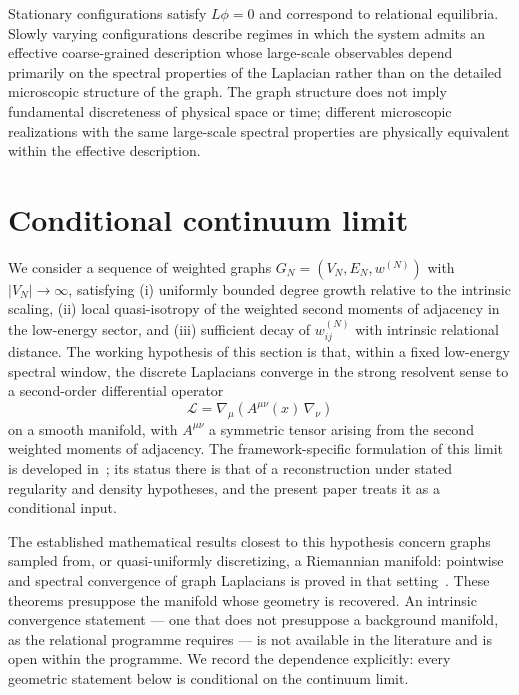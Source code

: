 \documentclass[epj]{svjour}
\begin{document}
  Stationary configurations satisfy $L\phi = 0$ and correspond to relational equilibria.
  Slowly varying configurations describe regimes in which the system admits an effective
  coarse-grained description whose large-scale observables depend primarily on the spectral
  properties of the Laplacian rather than on the detailed microscopic structure of the graph.
  The graph structure does not imply fundamental discreteness of physical space or time; different
  microscopic realizations with the same large-scale spectral properties are physically equivalent
  within the effective description.

  \section{Conditional continuum limit}
  \label{sec:continuum-limit-and-effective-operators}

  We consider a sequence of weighted graphs $G_N = (V_N, E_N, w^{(N)})$ with $|V_N| \to \infty$,
  satisfying
  (i) uniformly bounded degree growth relative to the intrinsic scaling,
  (ii) local quasi-isotropy of the weighted second moments of adjacency in the low-energy sector,
  and (iii) sufficient decay of $w^{(N)}_{ij}$ with intrinsic relational distance.
  The working hypothesis of this section is that, within a fixed low-energy spectral window, the
  discrete Laplacians converge in the strong resolvent sense to a second-order differential
  operator
  \begin{equation}
    \mathcal{L}
    = \nabla_\mu\!\left(A^{\mu\nu}(x)\,\nabla_\nu\right)
    \label{eq:limit-operator}
  \end{equation}
  on a smooth manifold, with $A^{\mu\nu}$ a symmetric tensor arising from the second weighted
  moments of adjacency.
  The framework-specific formulation of this limit is developed in~\cite{Beau2026a}; its status
  there is that of a reconstruction under stated regularity and density hypotheses, and the present
  paper treats it as a conditional input.

  The established mathematical results closest to this hypothesis concern graphs sampled from, or
  quasi-uniformly discretizing, a Riemannian manifold: pointwise and spectral convergence of graph
  Laplacians is proved in that setting~\cite{BelkinNiyogi2008,BuragoIvanovKurylev2014}.
  These theorems presuppose the manifold whose geometry is recovered.
  An intrinsic convergence statement --- one that does not presuppose a background manifold, as the
  relational programme requires --- is not available in the literature and is open within the
  programme.
  We record the dependence explicitly: every geometric statement below is conditional on the
  continuum limit.
\end{document}
